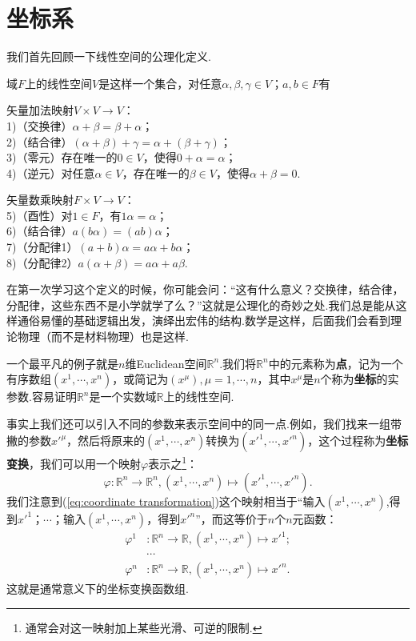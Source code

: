 \section{坐标系}\label{sec:Coordinates}
	我们首先回顾一下线性空间的公理化定义.
		\begin{definition}
			域$F$上的线性空间$V$是这样一个集合，对任意$\alpha,\beta,\gamma\in V$；$a,b\in F$有

			矢量加法映射$V\times V\rightarrow V$：\\
			1)（交换律）$\alpha+\beta=\beta+\alpha$；\\
			2)（结合律）$(\alpha+\beta)+\gamma=\alpha+(\beta+\gamma)$；\\
			3)（零元）存在唯一的$0\in V$，使得$0+\alpha=\alpha$；\\
			4)（逆元）对任意$\alpha\in V$，存在唯一的$\beta\in V$，使得$\alpha+\beta=0$.
			
			矢量数乘映射$F\times V\rightarrow V$：\\
			5)（酉性）对$1\in F$，有$1\alpha=\alpha$；\\
			6)（结合律）$a(b\alpha)=(ab)\alpha$；\\
			7)（分配律1）$(a+b)\alpha=a\alpha+b\alpha$；\\
			8)（分配律2）$a(\alpha+\beta)=a\alpha+a\beta$.
		\end{definition}
	在第一次学习这个定义的时候，你可能会问：“这有什么意义？交换律，结合律，分配律，这些东西不是小学就学了么？”这就是公理化的奇妙之处.我们总是能从这样通俗易懂的基础逻辑出发，演绎出宏伟的结构.数学是这样，后面我们会看到理论物理（而不是材料物理）也是这样.
			
	一个最平凡的例子就是$n$维Euclidean空间$\mathbb{R}^n$.我们将$\mathbb{R}^n$中的元素称为\textbf{点}，记为一个有序数组$(x^1,\cdots,x^n)$，或简记为$(x^\mu),\mu=1,\cdots,n$，其中$x^\mu$是$n$个称为\textbf{坐标}的实参数.容易证明$\mathbb{R}^n$是一个实数域$\mathbb{R}$上的线性空间.
			
	事实上我们还可以引入不同的参数来表示空间中的同一点.例如，我们找来一组带撇的参数$x'^\mu$，然后将原来的$(x^1,\cdots,x^n)$转换为$(x'^1,\cdots,x'^n)$，这个过程称为\textbf{坐标变换}，我们可以用一个映射$\varphi$表示之\footnote{通常会对这一映射加上某些光滑、可逆的限制.}：
	\begin{equation}\label{eq:coordinate transformation}
		\varphi:\mathbb{R}^n\rightarrow \mathbb{R}^n,(x^1,\cdots,x^n)\mapsto (x'^1,\cdots,x'^n).
	\end{equation}
	我们注意到(\ref{eq:coordinate transformation})这个映射相当于“输入$(x^1,\cdots,x^n)$,得到$x'^1$；$\cdots$；输入$(x^1,\cdots,x^n)$，得到$x'^n$”，而这等价于$n$个$n$元函数：
	\begin{equation}
		\begin{split}
			\varphi^1&:\mathbb{R}^n\rightarrow \mathbb{R},(x^1,\cdots,x^n)\mapsto x'^1;\\
			&\cdots\\
			\varphi^n&:\mathbb{R}^n\rightarrow \mathbb{R},(x^1,\cdots,x^n)\mapsto x'^n.
		\end{split}
	\end{equation}
	这就是通常意义下的坐标变换函数组.
			
